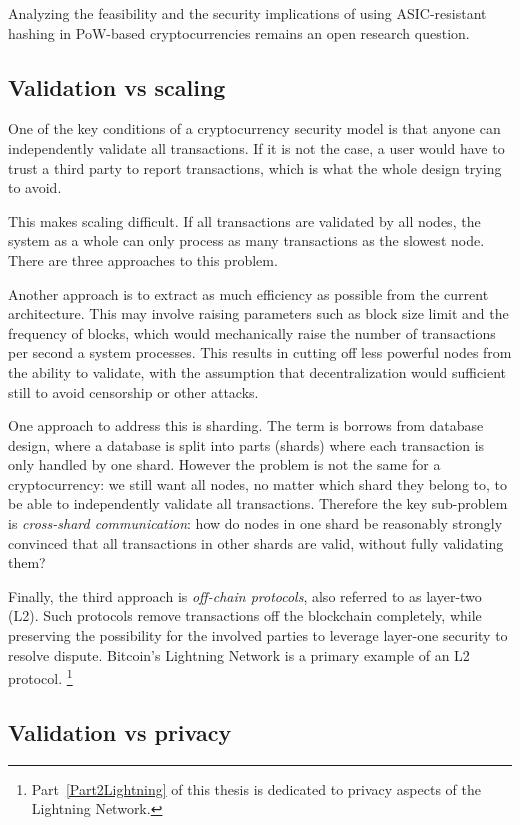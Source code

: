 Analyzing the feasibility and the security implications of using ASIC-resistant hashing in PoW-based cryptocurrencies remains an open research question.


\subsection{Validation vs scaling}

One of the key conditions of a cryptocurrency security model is that anyone can independently validate all transactions.
If it is not the case, a user would have to trust a third party to report transactions, which is what the whole design trying to avoid.

This makes scaling difficult.
If all transactions are validated by all nodes, the system as a whole can only process as many transactions as the slowest node.
There are three approaches to this problem.

Another approach is to extract as much efficiency as possible from the current architecture.
This may involve raising parameters such as block size limit and the frequency of blocks, which would mechanically raise the number of transactions per second a system processes.
This results in cutting off less powerful nodes from the ability to validate, with the assumption that decentralization would sufficient still to avoid censorship or other attacks.

One approach to address this is sharding.
The term is borrows from database design, where a database is split into parts (shards) where each transaction is only handled by one shard.
However the problem is not the same for a cryptocurrency: we still want all nodes, no matter which shard they belong to, to be able to independently validate all transactions.
Therefore the key sub-problem is \textit{cross-shard communication}: how do nodes in one shard be reasonably strongly convinced that all transactions in other shards are valid, without fully validating them?

Finally, the third approach is \textit{off-chain protocols}, also referred to as layer-two (L2).
Such protocols remove transactions off the blockchain completely, while preserving the possibility for the involved parties to leverage layer-one security to resolve dispute.
Bitcoin's Lightning Network is a primary example of an L2 protocol.
\footnote{Part~\ref{Part2Lightning} of this thesis is dedicated to privacy aspects of the Lightning Network.}


\subsection{Validation vs privacy}


